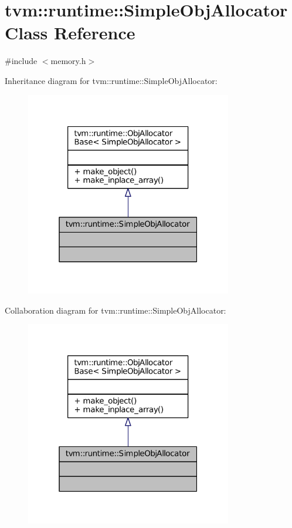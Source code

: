 \hypertarget{classtvm_1_1runtime_1_1SimpleObjAllocator}{}\section{tvm\+:\+:runtime\+:\+:Simple\+Obj\+Allocator Class Reference}
\label{classtvm_1_1runtime_1_1SimpleObjAllocator}


{\ttfamily \#include $<$memory.\+h$>$}



Inheritance diagram for tvm\+:\+:runtime\+:\+:Simple\+Obj\+Allocator\+:
\nopagebreak
\begin{figure}[H]
\begin{center}
\leavevmode
\includegraphics[width=256pt]{classtvm_1_1runtime_1_1SimpleObjAllocator__inherit__graph}
\end{center}
\end{figure}


Collaboration diagram for tvm\+:\+:runtime\+:\+:Simple\+Obj\+Allocator\+:
\nopagebreak
\begin{figure}[H]
\begin{center}
\leavevmode
\includegraphics[width=256pt]{classtvm_1_1runtime_1_1SimpleObjAllocator__coll__graph}
\end{center}
\end{figure}
